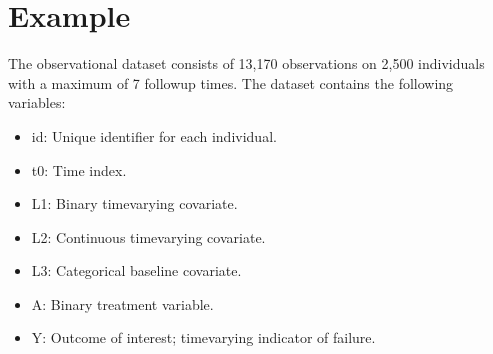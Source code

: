 \documentclass[letterpaper,10pt,english]{sphinxmanual}
\begin{document}
\section{Example}
\label{\detokenize{Get Started:example}}
\sphinxAtStartPar
The observational dataset
 consists of 13,170 observations on 2,500 individuals with a maximum of 7 follow\sphinxhyphen{}up
times. The dataset contains the following variables:
\begin{itemize}
\item {} 
\sphinxAtStartPar
id: Unique identifier for each individual.

\item {} 
\sphinxAtStartPar
t0: Time index.

\item {} 
\sphinxAtStartPar
L1: Binary time\sphinxhyphen{}varying covariate.

\item {} 
\sphinxAtStartPar
L2: Continuous time\sphinxhyphen{}varying covariate.

\item {} 
\sphinxAtStartPar
L3: Categorical baseline covariate.

\item {} 
\sphinxAtStartPar
A: Binary treatment variable.

\item {} 
\sphinxAtStartPar
Y: Outcome of interest; time\sphinxhyphen{}varying indicator of failure.

\end{itemize}
\end{document}
